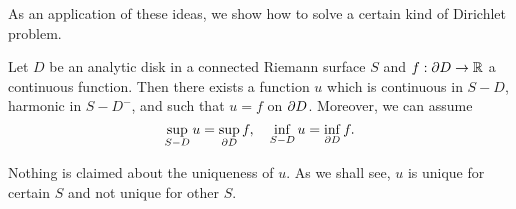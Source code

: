 \documentclass[a4paper,11pt]{article}
\begin{document}
As an application of these ideas, we show how to solve a certain kind
of Dirichlet problem.

\begin{propn}
  \label{propn:13}
  Let $D$ be an analytic disk in a connected Riemann surface $S$ and
  $f : \partial D \to {\mathbb R}$ a continuous function.  Then there exists a
  function $u$ which is continuous in $S-D$, harmonic in $S-D^-$, and
  such that $u = f$ on $\partial D$.  Moreover, we can assume
  $$
  \sup_{S-D} u = \sup_{\partial D} f,\quad
  \inf_{S-D} u = \inf_{\partial D} f.
  $$
\end{propn}

\begin{rem}
  Nothing is claimed about the uniqueness of $u$.  As we shall see,
  $u$ is unique for certain $S$ and not unique for other $S$.
\end{rem}
\end{document}

